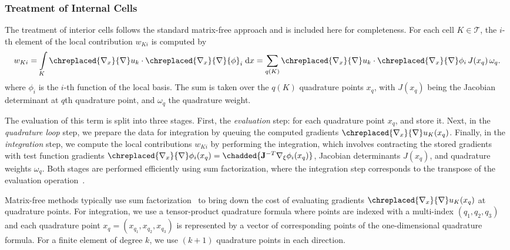 \documentclass[11pt,a4paper]{article}
\begin{document}
\subsubsection{Treatment of Internal Cells}
The treatment of interior cells follows the standard matrix-free approach and is included here for completeness. For
each cell $K \in \mathcal{T}$, the $i$-th element of the local contribution ${w}_{Ki}$ is computed by
\begin{equation}
    w_{Ki}=\int\limits_K  \chreplaced{\nabla_x}{\nabla} u_k   \cdot \chreplaced{\nabla_x}{\nabla} {\phi }_i \;	\Dd x
    = \sum_{q(K)}	\chreplaced{\nabla_x}{\nabla} u_k   \cdot  \chreplaced{\nabla_x}{\nabla}\phi_i \, J(x_q) \,
    \omega_q.
\end{equation}
where $\phi_i$ is the $i$-th function of the local basis. The sum is taken over the $q(K)$ quadrature points $x_q$,
with $J(x_q)$ being the Jacobian determinant
at  $q$th quadrature point, and $\omega_q$ the quadrature weight. 

The evaluation of this term is split into three stages. First, the \textit{evaluation} step: for each quadrature point
$x_q$,  and store it. Next, in the \textit{quadrature loop} step, we prepare the data for
integration by queuing the computed gradients $\chreplaced{\nabla_x}{\nabla} u_K(x_q)$. Finally, in the
\textit{integration} step, we compute the local contributions $w_{Ki}$ by performing the integration, which involves
contracting the stored gradients with test function gradients $\chreplaced{\nabla_x}{\nabla}\phi_i(x_q)=
    \chadded{\bfm{J}^{-T} \nabla_\xi \phi_i(x_q) }$, Jacobian determinants $J(x_q)$, and quadrature weights $\omega_q$.
Both stages are performed efficiently using sum factorization, where the integration step corresponds to the transpose
of the evaluation operation~\cite{kopriva2009spectral, deville2002high}.

Matrix-free methods typically use sum factorization~\cite{kronbichler2019fast,fischer2020scalability} to bring down the
cost of evaluating gradients \( \chreplaced{\nabla_x}{\nabla} u_K( {x}_q) \) at quadrature points. For integration, we
use a tensor-product quadrature formula where points are indexed with a multi-index \( (q_1, q_2, q_3 )\) and each
quadrature point \( x_{q} = (x_{q_1}, x_{q_2}, x_{q_3} ) \) is represented by a vector of corresponding points of the
one-dimensional quadrature formula. For a finite element of degree $k$, we use $(k+1)$ quadrature points in each
direction.
\end{document}
